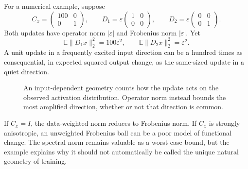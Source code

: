 For a numerical example, suppose
\[
 C_x=\begin{pmatrix}100&0\\0&1\end{pmatrix},\qquad
 D_1=\varepsilon\begin{pmatrix}1&0\\0&0\end{pmatrix},
 \qquad
 D_2=\varepsilon\begin{pmatrix}0&0\\0&1\end{pmatrix}.
\]
Both updates have operator norm \(|\varepsilon|\) and Frobenius norm \(|\varepsilon|\).  Yet
\[
 \mathbb E\|D_1x\|_2^2=100\varepsilon^2,\qquad
 \mathbb E\|D_2x\|_2^2=\varepsilon^2.
\]
A unit update in a frequently excited input direction can be a hundred times as consequential, in expected squared output change, as the same-sized update in a quiet direction.

\begin{figure}[H]
\centering
{}
\caption{An input-dependent geometry counts how the update acts on the observed activation distribution.  Operator norm instead bounds the most amplified direction, whether or not that direction is common.}
\label{fig:N20261017-input-geometry}
\end{figure}

If \(C_x=I\), the data-weighted norm reduces to Frobenius norm.  If \(C_x\) is strongly anisotropic, an unweighted Frobenius ball can be a poor model of functional change.  The spectral norm remains valuable as a worst-case bound, but the example explains why it should not automatically be called the unique natural geometry of training.

